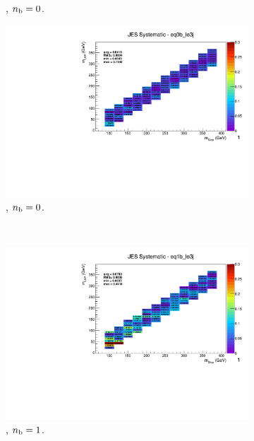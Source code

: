 \begin{figure}[ht!]
\begin{subfigure}[b]{0.32\textwidth}
    \caption{\njlow, $n_{\text{b}} = 0$.}
  \end{subfigure}
  \begin{subfigure}[b]{0.32\textwidth}
    \includegraphics[width=\textwidth, page=1]{Figs/sms/t2degen/v19/systs_v2/T2_4body_JES_eq0b_le3j.pdf}
    \caption{\njlow, $n_{\text{b}} = 0$.}
    \label{fig:sms-jes-tdegen-le3j-0b}
  \end{subfigure}\\
  \begin{subfigure}[b]{0.32\textwidth}
    \includegraphics[width=\textwidth, page=12]{Figs/sms/t2degen/v19/systs_v2/T2_4body_JES_eq1b_le3j.pdf}
    \caption{\njlow, $n_{\text{b}} = 1$.}
  \end{subfigure}
  \begin{subfigure}[b]{0.32\textwidth}

\end{subfigure}
\end{figure}
